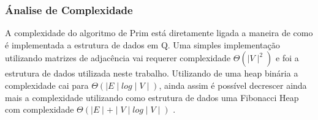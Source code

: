 \documentclass[a4paper,12pt]{article}
\begin{document}
\subsubsection{Ánalise de Complexidade}

A complexidade do algoritmo de Prim está diretamente ligada a maneira de como é implementada a estrutura de dados em Q. Uma simples implementação utilizando matrizes de adjacência vai requerer complexidade \emph{$\Theta(\mid V\mid^2)$} e foi a estrutura de dados utilizada neste trabalho. Utilizando de uma heap binária a complexidade cai para \emph{$\Theta(\mid E\mid log\mid V\mid)$}, ainda assim é possível decrescer ainda mais a complexidade utilizando como estrutura de dados uma Fibonacci Heap com complexidade \emph{$\Theta(\mid E\mid+\mid V\mid log\mid V\mid)$} \cite{Cormem}.
\end{document}
